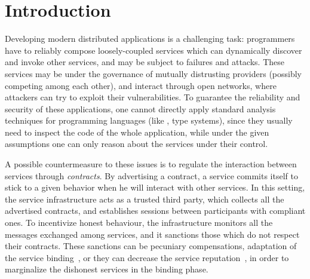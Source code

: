 \section{Introduction}


Developing modern distributed applications 
is a challenging task:
programmers have to reliably compose loosely-coupled services
which can dynamically discover and invoke other services,
and may be subject to failures and attacks.
These services may be under the governance of mutually distrusting providers 
(possibly competing among each other), 
and interact through open networks, %
where attackers can try to exploit their vulnerabilities. %
%
To guarantee the reliability and security of these applications,
one cannot directly apply standard analysis techniques for programming languages
(like \eg, type systems), 
since they usually need to inspect the code of the whole application,
while under the given assumptions one can only %
reason about the services under their control. %

A possible countermeasure to these issues is to regulate the interaction
between services through \emph{contracts}.
By advertising a contract, a service commits itself
to stick to a given behavior when he will interact with other services.
In this setting, the service infrastructure acts as a trusted third party, 
which collects all the advertised contracts, and establishes sessions
between participants with compliant ones. %
To incentivize honest behaviour,
the infrastructure monitors all the messages exchanged among services,
and it sanctions those which do not respect their contracts.
These sanctions can be pecuniary compensations,
adaptation of the service binding~\cite{Mukhija2007qos},
or they can decrease the service reputation~\cite{CO2middleware},
in order to marginalize the dishonest services in the binding phase.




